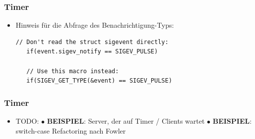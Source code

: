 \documentclass{beamer}
\begin{document}
\begin{frame}[fragile]
 \frametitle{Timer}
 \begin{itemize}
  \item Hinweis f\"ur die Abfrage des Benachrichtigung-Typs:\newline
  \begin{lstlisting}[frame=single]
   // Don't read the struct sigevent directly:
   if(event.sigev_notify == SIGEV_PULSE)

   // Use this macro instead:
   if(SIGEV_GET_TYPE(&event) == SIGEV_PULSE)
  \end{lstlisting}
 \end{itemize}
\end{frame}

\begin{frame}[fragile]
 \frametitle{Timer}
 \begin{itemize}
  \item TODO:\newline\newline
  $\bullet$ \textbf{BEISPIEL}: Server, der auf Timer / Clients wartet\newline\newline
  $\bullet$ \textbf{BEISPIEL}: switch-case Refactoring nach Fowler\newline\newline
 \end{itemize}
\end{frame}
\end{document}
